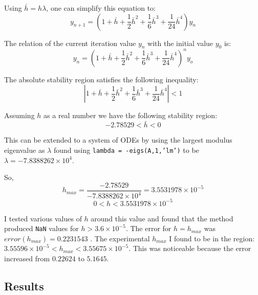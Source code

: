 \documentclass[a4paper, 11pt]{article}
\begin{document}
				Using $ \bar{h} = h\lambda $, one can simplify this equation to:
				\begin{equation}
					y_{n+1} = \left(1 + \bar{h} + \frac{1}{2}\bar{h}^2 + \frac{1}{6}\bar{h}^3 + \frac{1}{24}\bar{h}^4\right)y_n
				\end{equation}
			
				The relation of the current iteration value $y_n$ with the initial value $y_0$ is:
				\begin{equation}
					y_n = \left(1 + \bar{h} + \frac{1}{2}\bar{h}^2 + \frac{1}{6}\bar{h}^3 + \frac{1}{24}\bar{h}^4\right)^n y_o
				\end{equation}
			
				The absolute stability region satisfies the following inequality:
				\begin{equation}
					|1 + \bar{h} + \frac{1}{2}\bar{h}^2 + \frac{1}{6}\bar{h}^3 + \frac{1}{24}\bar{h}^4| < 1 
				\end{equation}
			
				Assuming $h$ as a real number we have the following stability region:
				\begin{equation}
					-2.78529 < \bar{h} < 0
				\end{equation}
				
				This can be extended to a system of ODEs by using the largest modulus eigenvalue as $ \lambda $ found using \texttt{lambda = -eigs(A,1,’lm’)} to be $ \lambda = -7.8388262\times 10^{4} $.		
				
				So, 
				\begin{equation}
					h_{max} = \frac{-2.78529}{-7.8388262\times 10^{4}} = 3.5531978\times 10^{-5} 
				\end{equation}
				\begin{equation}
					0 < h < 3.5531978\times 10^{-5} 
				\end{equation}
			 
				I tested various values of $h$ around this value and found that the method produced \texttt{NaN} values for $h > 3.6\times 10^{-5} $.
				The error for $ h = h_{max}$ was $error(h_{max}) = 0.2231543$ .
				The experimental $h_{max}$ I found to be in the region: $ 3.55596 \times 10^{-5} < h_{max} < 3.55675 \times 10^{-5}$.
				This was noticeable because the error increased from $ 0.22624 $ to $ 5.1645 $.
				
				
			\subsection*{Results}
			
\end{document}
